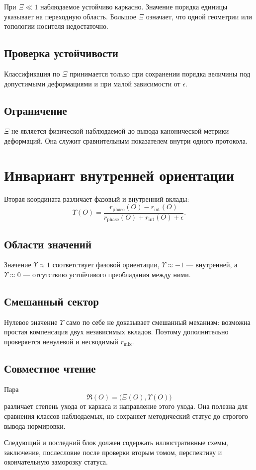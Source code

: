 При $\Xi\ll1$ наблюдаемое устойчиво каркасно. Значение порядка единицы
указывает на переходную область. Большое $\Xi$ означает, что одной геометрии
или топологии носителя недостаточно.

\section{Проверка устойчивости}

Классификация по $\Xi$ принимается только при сохранении порядка величины под
допустимыми деформациями и при малой зависимости от $\epsilon$.

\section{Ограничение}

$\Xi$ не является физической наблюдаемой до вывода канонической метрики
деформаций. Она служит сравнительным показателем внутри одного протокола.

\chapter{Инвариант внутренней ориентации}

Вторая координата различает фазовый и внутренний вклады:
\begin{equation}
 \Upsilon(O)=
 \frac{r_{\mathrm{phase}}(O)-r_{\mathrm{int}}(O)}
 {r_{\mathrm{phase}}(O)+r_{\mathrm{int}}(O)+\epsilon}.
\end{equation}

\section{Области значений}

Значение $\Upsilon\approx1$ соответствует фазовой ориентации,
$\Upsilon\approx-1$ --- внутренней, а $\Upsilon\approx0$ --- отсутствию
устойчивого преобладания между ними.

\section{Смешанный сектор}

Нулевое значение $\Upsilon$ само по себе не доказывает смешанный механизм:
возможна простая компенсация двух независимых вкладов. Поэтому дополнительно
проверяется ненулевой и несводимый $r_{\mathrm{mix}}$.

\section{Совместное чтение}

Пара
\begin{equation}
 \mathfrak R(O)=\bigl(\Xi(O),\Upsilon(O)\bigr)
\end{equation}
различает степень ухода от каркаса и направление этого ухода. Она полезна для
сравнения классов наблюдаемых, но сохраняет методический статус до строгого
вывода нормировки.

Следующий и последний блок должен содержать иллюстративные схемы, заключение,
послесловие после проверки вторым томом, перспективу и окончательную
заморозку статуса.